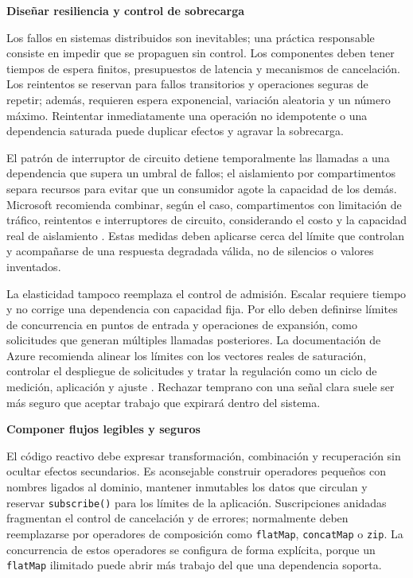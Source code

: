 \documentclass[12pt,letterpaper]{article}
\begin{document}
\textbf{Diseñar resiliencia y control de sobrecarga}\par
Los fallos en sistemas distribuidos son inevitables; una práctica responsable consiste en impedir que se propaguen sin control. Los componentes deben tener tiempos de espera finitos, presupuestos de latencia y mecanismos de cancelación. Los reintentos se reservan para fallos transitorios y operaciones seguras de repetir; además, requieren espera exponencial, variación aleatoria y un número máximo. Reintentar inmediatamente una operación no idempotente o una dependencia saturada puede duplicar efectos y agravar la sobrecarga.

El patrón de interruptor de circuito detiene temporalmente las llamadas a una dependencia que supera un umbral de fallos; el aislamiento por compartimentos separa recursos para evitar que un consumidor agote la capacidad de los demás. Microsoft recomienda combinar, según el caso, compartimentos con limitación de tráfico, reintentos e interruptores de circuito, considerando el costo y la capacidad real de aislamiento \parencite{microsoftbulkhead}. Estas medidas deben aplicarse cerca del límite que controlan y acompañarse de una respuesta degradada válida, no de silencios o valores inventados.

La elasticidad tampoco reemplaza el control de admisión. Escalar requiere tiempo y no corrige una dependencia con capacidad fija. Por ello deben definirse límites de concurrencia en puntos de entrada y operaciones de expansión, como solicitudes que generan múltiples llamadas posteriores. La documentación de Azure recomienda alinear los límites con los vectores reales de saturación, controlar el despliegue de solicitudes y tratar la regulación como un ciclo de medición, aplicación y ajuste \parencite{microsoftthrottling}. Rechazar temprano con una señal clara suele ser más seguro que aceptar trabajo que expirará dentro del sistema.

\textbf{Componer flujos legibles y seguros}\par
El código reactivo debe expresar transformación, combinación y recuperación sin ocultar efectos secundarios. Es aconsejable construir operadores pequeños con nombres ligados al dominio, mantener inmutables los datos que circulan y reservar \texttt{subscribe()} para los límites de la aplicación. Suscripciones anidadas fragmentan el control de cancelación y de errores; normalmente deben reemplazarse por operadores de composición como \texttt{flatMap}, \texttt{concatMap} o \texttt{zip}. La concurrencia de estos operadores se configura de forma explícita, porque un \texttt{flatMap} ilimitado puede abrir más trabajo del que una dependencia soporta.
\end{document}
